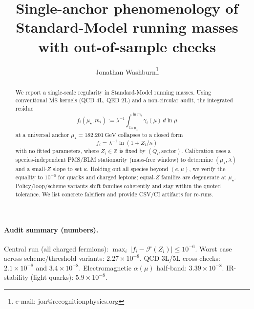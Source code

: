 \documentclass[epjc3]{svjour3}
\title{Single-anchor phenomenology of Standard-Model running masses with out-of-sample checks}
\author{Jonathan Washburn\orcidlink{0009-0001-8868-7497}\thanks{e-mail: jon@recognitionphysics.org}}
\institute{Recognition Science \& Recognition Physics Institute, Austin, Texas, USA}
\date{}
\begin{document}
\maketitle
\begin{abstract}
We report a single-scale regularity in Standard-Model running masses. Using conventional $\overline{\mathrm{MS}}$ kernels (QCD 4L, QED 2L) and a non-circular audit, the integrated residue
\[
f_i(\mu_\star,m_i):=\lambda^{-1}\!\int_{\ln\mu_\star}^{\ln m_i}\gamma_i(\mu)\,d\ln\mu
\]
at a universal anchor $\mu_\star=182.201\,\mathrm{GeV}$ collapses to a closed form
\[
f_i=\lambda^{-1}\ln(1+Z_i/\kappa)
\]
with no fitted parameters, where $Z_i\in\mathbb Z$ is fixed by $(Q_i,\mathrm{sector})$. Calibration uses a species-independent PMS/BLM stationarity (mass-free window) to determine $(\mu_\star,\lambda)$ and a small-$Z$ slope to set $\kappa$. Holding out all species beyond $(e,\mu)$, we verify the equality to $10^{-6}$ for quarks and charged leptons; equal-$Z$ families are degenerate at $\mu_\star$. Policy/loop/scheme variants shift families coherently and stay within the quoted tolerance. We list concrete falsifiers and provide CSV/CI artifacts for re-runs.
\end{abstract}

\begin{center}
\end{center}

\paragraph{Audit summary (numbers).}
Central run (all charged fermions): $\max_i\,|f_i-\mathcal F(Z_i)| \le 10^{-6}$. Worst case across scheme/threshold variants: $2.27\times 10^{-8}$. QCD 3L/5L cross-checks: $2.1\times 10^{-8}$ and $3.4\times 10^{-8}$. Electromagnetic $\alpha(\mu)$ half-band: $3.39\times 10^{-8}$. IR-stability (light quarks): $5.9\times 10^{-8}$.
\end{document}
